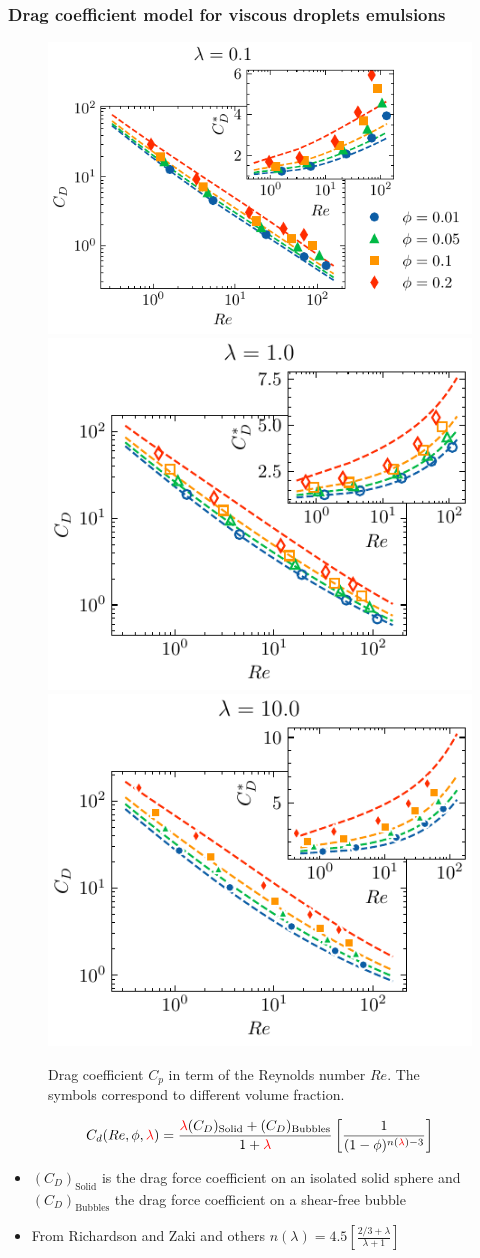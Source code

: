 \documentclass{sintefbeamer}
\begin{document}
\begin{frame}
  \frametitle{Drag coefficient model for viscous droplets emulsions}
  \begin{figure}[h!]
    \centering    
    \includegraphics[height = 0.23\textwidth]{image/HOMOGENEOUS_final/CA/Cp_l_0.pdf}
    \includegraphics[height = 0.23\textwidth]{image/HOMOGENEOUS_final/CA/Cp_l_1.pdf}
    \includegraphics[height = 0.23\textwidth]{image/HOMOGENEOUS_final/CA/Cp_l_10.pdf}
    \caption{
        Drag coefficient $C_p$ in term of the Reynolds number $Re$.  
        The symbols correspond to different volume fraction. 
    }
    \label{fig:Cp}
\end{figure}
\begin{equation*}
  C_d(Re,\phi,\textcolor{red}{\lambda})
  = \frac{  \textcolor{red}{\lambda}   (C_D)_\text{Solid}+ (C_D)_\text{Bubbles}}
  {1+\textcolor{red}{\lambda}} 
  \left[
    \frac{1}{(1- \phi)^{n(\textcolor{red}{\lambda})-3}}
  \right]
\end{equation*}
\begin{itemize}
  \item $(C_D)_\text{Solid}$ is the drag force coefficient on an isolated solid sphere and $(C_D)_\text{Bubbles}$ the drag force coefficient on a shear-free bubble
  \item From Richardson and Zaki and others $n(\lambda) = 4.5 \left[\frac{2/3 +\lambda }{\lambda +1}\right]$ 
\end{itemize}

\end{frame}
\end{document}
